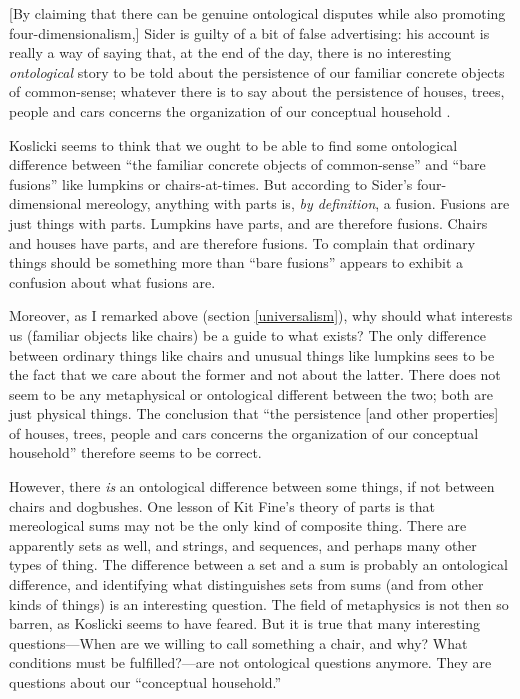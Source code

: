 \documentclass[11pt]{article}
\newenvironment{squote}{%
\begin{spacing}{1}
\begin{list}{}{%
\setlength{\labelwidth}{0pt}%
\rightmargin\leftmargin%
}
\item\relax
}{%
\end{list}%
\end{spacing}
}
\begin{document}
\begin{spacing}{1.5}
\begin{squote}
[By claiming that there can be genuine ontological disputes while also
  promoting four-dimensionalism,] Sider is guilty of a bit of false
advertising: his account is really a way of saying that, at the end of
the day, there is no interesting {\em ontological} story to be told
about the persistence of our familiar concrete objects of
common-sense; whatever there is to say about the persistence of
houses, trees, people and cars concerns the organization of our
conceptual household \citeyearpar[124--125]{koslicki2003}.
\end{squote}

Koslicki seems to think that we ought to be able to find some
ontological difference between ``the familiar concrete objects of
common-sense'' and ``bare fusions'' like lumpkins or chairs-at-times.
But according to Sider's four-dimensional mereology, anything with
parts is, {\em by definition}, a fusion.  Fusions are just things with
parts.  Lumpkins have parts, and are therefore fusions.  Chairs and
houses have parts, and are therefore fusions.  To complain that
ordinary things should be something more than ``bare fusions'' appears
to exhibit a confusion about what fusions are.

Moreover, as I remarked above (section \ref{universalism}), why should
what interests us (familiar objects like chairs) be a guide to what
exists?  The only difference between ordinary things like chairs and
unusual things like lumpkins sees to be the fact that we care about
the former and not about the latter.  There does not seem to be any
metaphysical or ontological different between the two; both are just
physical things.  The conclusion that ``the persistence [and other
  properties] of houses, trees, people and cars concerns the
organization of our conceptual household'' therefore seems to be
correct.

However, there {\em is} an ontological difference between some things,
if not between chairs and dogbushes.  One lesson of Kit Fine's theory
of parts is that mereological sums may not be the only kind of
composite thing.  There are apparently sets as well, and strings, and
sequences, and perhaps many other types of thing.  The difference
between a set and a sum is probably an ontological difference, and
identifying what distinguishes sets from sums (and from other kinds of
things) is an interesting question.  The field of metaphysics is not
then so barren, as Koslicki seems to have feared.  But it is true that
many interesting questions---When are we willing to call something a
chair, and why?  What conditions must be fulfilled?---are not
ontological questions anymore.  They are questions about our
``conceptual household.''

\ifstandalone
\end{spacing}


\fi
\end{document}
